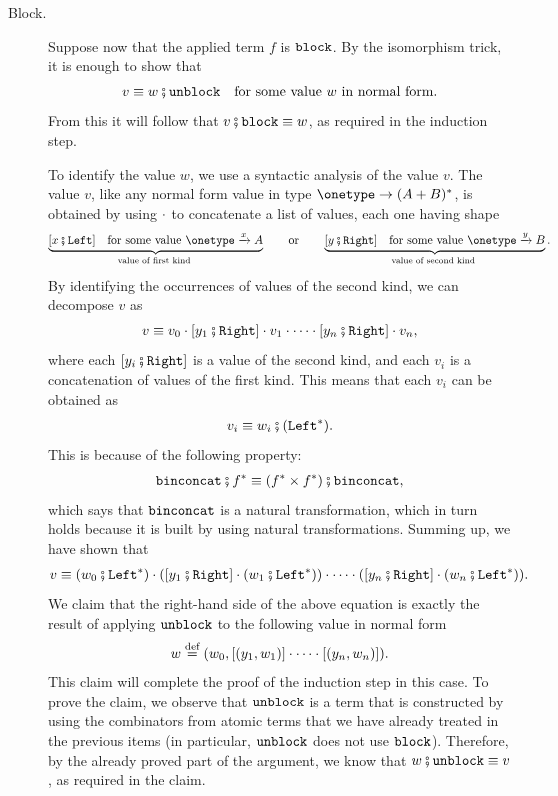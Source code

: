 \begin{description}
    \item[Block.] Suppose now that the applied term $f$ is $\mathtt{block}$.  By the isomorphism trick, it is enough to show that
    \begin{align*}
    v \equiv w\comp \unblockterm \quad\text{for some value $w$ in normal form}.
    \end{align*}
     From this it will follow that $v\comp\blockterm \equiv w$, as required in the induction step. 
    
    To identify the value $w$, we use a syntactic analysis of the value $v$. 
    The value $v$, like any normal form value in type $\onetype \to (A+B)^*$, is obtained by using $\cdot$ to concatenate a list of values, each one having shape 
    \begin{align*}
    \myunderbrace{[x\comp\leftterm] \quad \text{for some value }\onetype \xrightarrow x A}{value of first kind}
    \qquad \text{or} \qquad
    \myunderbrace{[y\comp\rightterm] \quad \text{for some value }\onetype \xrightarrow y B}{value of second kind}.
    \end{align*}
    By identifying the occurrences of values of the second kind, we can decompose $v$ as 
    \begin{align*}
    v \equiv v_0 \wdot [y_1\comp\rightterm] \wdot v_1  \wdot \cdots \wdot [y_n\comp\rightterm] \wdot v_n,
    \end{align*}
    where each $[y_i\comp\rightterm]$ is a value of the second kind, and each $v_i$ is a concatenation of   values of the first kind. This means that each $v_i$ can be obtained as 
    \begin{align*}
    v_i \equiv w_i\comp(\leftterm^*).
    \end{align*}
    This is because of the following property: 
    \begin{align*}
    \binconcatterm\comp f^* \equiv (f^* \times f^*)\comp \binconcatterm,
    \end{align*}
    which says that $\mathtt{binconcat}$ is a natural transformation, which in turn holds because it is built by using natural transformations. Summing up, we have shown that 
    \begin{align*}
    v \equiv (w_0\comp\leftterm^*) \wdot ([y_1\comp\rightterm] \wdot (w_1\comp\leftterm^*)) \wdot \cdots \wdot ([y_n\comp\rightterm] \wdot (w_n\comp\leftterm^*)).
    \end{align*}
    We claim that the right-hand side of the above equation is exactly the result of applying $\mathtt{unblock}$ to the following value in normal form 
    \begin{align*}
    w \stackrel{\text{def}}= (w_0, [(y_1,w_1)] \cdot \cdots \cdot [(y_n,w_n)]).
    \end{align*}
    This claim will complete the  proof of the induction step in this case. To prove the claim, we observe that  $\mathtt{unblock}$ is a term that is constructed by using the combinators from atomic terms that we have already treated in the previous items (in particular, $\mathtt{unblock}$ does not use $\mathtt{block}$). Therefore, by the already proved part of the argument, we know that $w\comp \unblockterm \equiv v$, as required in the claim.


\end{description}
